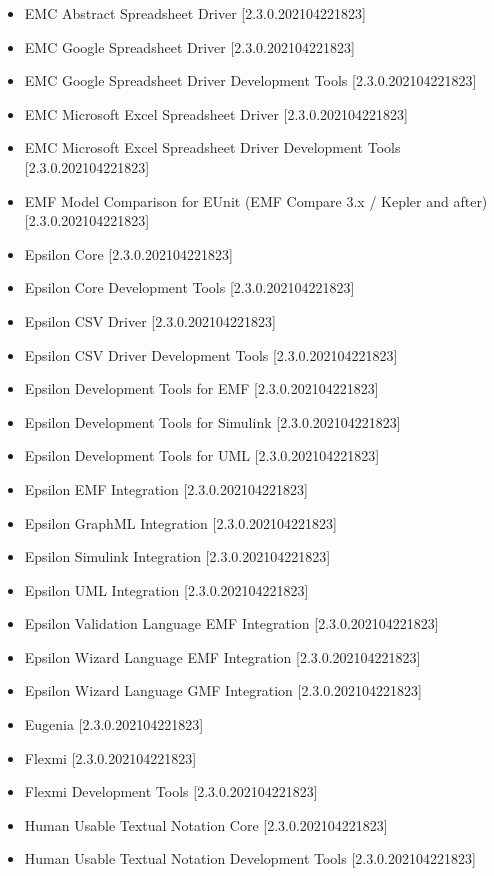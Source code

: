 \begin{description}
\begin{description}
\begin{itemize}
				\item EMC Abstract Spreadsheet Driver [2.3.0.202104221823]
				\item EMC Google Spreadsheet Driver [2.3.0.202104221823]
				\item EMC Google Spreadsheet Driver Development Tools [2.3.0.202104221823]
				\item EMC Microsoft Excel Spreadsheet Driver [2.3.0.202104221823]
				\item EMC Microsoft Excel Spreadsheet Driver Development Tools [2.3.0.202104221823]
				\item EMF Model Comparison for EUnit (EMF Compare 3.x / Kepler and after) [2.3.0.202104221823]
				\item Epsilon Core [2.3.0.202104221823]
				\item Epsilon Core Development Tools [2.3.0.202104221823]
				\item Epsilon CSV Driver [2.3.0.202104221823]
				\item Epsilon CSV Driver Development Tools [2.3.0.202104221823]
				\item Epsilon Development Tools for EMF [2.3.0.202104221823]
				\item Epsilon Development Tools for Simulink [2.3.0.202104221823]
				\item Epsilon Development Tools for UML [2.3.0.202104221823]
				\item Epsilon EMF Integration [2.3.0.202104221823]
				\item Epsilon GraphML Integration [2.3.0.202104221823]
				\item Epsilon Simulink Integration [2.3.0.202104221823]
				\item Epsilon UML Integration [2.3.0.202104221823]
				\item Epsilon Validation Language EMF Integration [2.3.0.202104221823]
				\item Epsilon Wizard Language EMF Integration [2.3.0.202104221823]
				\item Epsilon Wizard Language GMF Integration [2.3.0.202104221823]
				\item Eugenia [2.3.0.202104221823]
				\item Flexmi [2.3.0.202104221823]
				\item Flexmi Development Tools [2.3.0.202104221823]
				\item Human Usable Textual Notation Core [2.3.0.202104221823]
				\item Human Usable Textual Notation Development Tools [2.3.0.202104221823]

\end{itemize}
\end{description}
\end{description}

